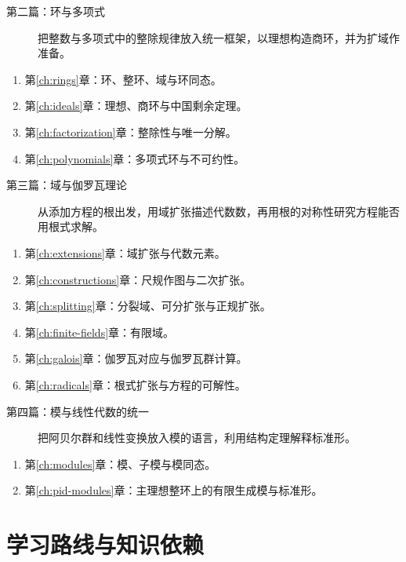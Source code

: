 \begin{description}
  \item[第二篇：环与多项式] 把整数与多项式中的整除规律放入统一框架，以理想构造商环，并为扩域作准备。
\end{description}
\begin{enumerate}[resume]
  \item 第\ref{ch:rings}章：环、整环、域与环同态。
  \item 第\ref{ch:ideals}章：理想、商环与中国剩余定理。
  \item 第\ref{ch:factorization}章：整除性与唯一分解。
  \item 第\ref{ch:polynomials}章：多项式环与不可约性。
\end{enumerate}

\begin{description}
  \item[第三篇：域与伽罗瓦理论] 从添加方程的根出发，用域扩张描述代数数，再用根的对称性研究方程能否用根式求解。
\end{description}
\begin{enumerate}[resume]
  \item 第\ref{ch:extensions}章：域扩张与代数元素。
  \item 第\ref{ch:constructions}章：尺规作图与二次扩张。
  \item 第\ref{ch:splitting}章：分裂域、可分扩张与正规扩张。
  \item 第\ref{ch:finite-fields}章：有限域。
  \item 第\ref{ch:galois}章：伽罗瓦对应与伽罗瓦群计算。
  \item 第\ref{ch:radicals}章：根式扩张与方程的可解性。
\end{enumerate}

\begin{description}
  \item[第四篇：模与线性代数的统一] 把阿贝尔群和线性变换放入模的语言，利用结构定理解释标准形。
\end{description}
\begin{enumerate}[resume]
  \item 第\ref{ch:modules}章：模、子模与模同态。
  \item 第\ref{ch:pid-modules}章：主理想整环上的有限生成模与标准形。
\end{enumerate}

\section{学习路线与知识依赖}

